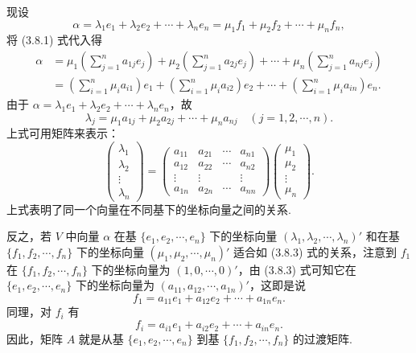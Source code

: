 \documentclass[UTF8,12pt,a4paper,fontset=fandol]{ctexart}
\begin{document}
现设
\[
\alpha=\lambda_1e_1+\lambda_2e_2+\cdots+\lambda_ne_n=\mu_1f_1+\mu_2f_2+\cdots+\mu_nf_n,
\]
将 (3.8.1) 式代入得
\[
\begin{aligned}
\alpha&=\mu_1\left(\sum_{j=1}^n a_{1j}e_j\right)+\mu_2\left(\sum_{j=1}^n a_{2j}e_j\right)+\cdots+\mu_n\left(\sum_{j=1}^n a_{nj}e_j\right)\\
&=\left(\sum_{i=1}^n \mu_i a_{i1}\right)e_1+\left(\sum_{i=1}^n \mu_i a_{i2}\right)e_2+\cdots+\left(\sum_{i=1}^n \mu_i a_{in}\right)e_n.
\end{aligned}
\]
由于 $\alpha=\lambda_1e_1+\lambda_2e_2+\cdots+\lambda_ne_n$，故
\begin{equation}
\lambda_j=\mu_1a_{1j}+\mu_2a_{2j}+\cdots+\mu_na_{nj}\quad (j=1,2,\cdots,n).
\tag{3.8.2}
\end{equation}
上式可用矩阵来表示：
\begin{equation}
\left(\begin{array}{c}
\lambda_1\\
\lambda_2\\
\vdots\\
\lambda_n
\end{array}\right)
=
\left(\begin{array}{cccc}
a_{11}&a_{21}&\cdots&a_{n1}\\
a_{12}&a_{22}&\cdots&a_{n2}\\
\vdots&\vdots&&\vdots\\
a_{1n}&a_{2n}&\cdots&a_{nn}
\end{array}\right)
\left(\begin{array}{c}
\mu_1\\
\mu_2\\
\vdots\\
\mu_n
\end{array}\right).
\tag{3.8.3}
\end{equation}
上式表明了同一个向量在不同基下的坐标向量之间的关系.

反之，若 $V$ 中向量 $\alpha$ 在基 $\{e_1,e_2,\cdots,e_n\}$ 下的坐标向量 $(\lambda_1,\lambda_2,\cdots,\lambda_n)'$ 和在基 $\{f_1,f_2,\cdots,f_n\}$ 下的坐标向量 $(\mu_1,\mu_2,\cdots,\mu_n)'$ 适合如 (3.8.3) 式的关系，注意到 $f_1$ 在 $\{f_1,f_2,\cdots,f_n\}$ 下的坐标向量为 $(1,0,\cdots,0)'$，由 (3.8.3) 式可知它在 $\{e_1,e_2,\cdots,e_n\}$ 下的坐标向量为 $(a_{11},a_{12},\cdots,a_{1n})'$，这即是说
\[
f_1=a_{11}e_1+a_{12}e_2+\cdots+a_{1n}e_n.
\]
同理，对 $f_i$ 有
\[
f_i=a_{i1}e_1+a_{i2}e_2+\cdots+a_{in}e_n.
\]
因此，矩阵 $A$ 就是从基 $\{e_1,e_2,\cdots,e_n\}$ 到基 $\{f_1,f_2,\cdots,f_n\}$ 的过渡矩阵.
\end{document}
